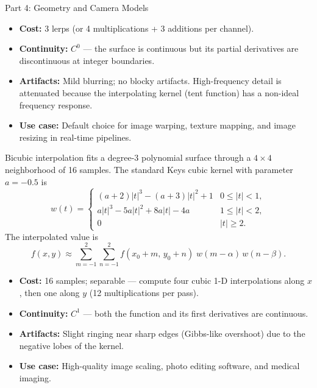 \documentclass[letterpaper]{article}
\begin{document}
\begin{notes}{Part 4: Geometry and Camera Models}
\begin{itemize}
    \item \textbf{Cost:} 3 lerps (or 4 multiplications + 3 additions per channel).
    \item \textbf{Continuity:} $C^0$ — the surface is continuous but its partial derivatives are discontinuous at integer boundaries.
    \item \textbf{Artifacts:} Mild blurring; no blocky artifacts. High-frequency detail is attenuated because the interpolating kernel (tent function) has a non-ideal frequency response.
    \item \textbf{Use case:} Default choice for image warping, texture mapping, and image resizing in real-time pipelines.
\end{itemize}


Bicubic interpolation fits a degree-3 polynomial surface through a $4\times4$ neighborhood of 16 samples. The standard Keys cubic kernel with parameter $a=-0.5$ is
$$w(t) = \begin{cases}
(a+2)|t|^3 - (a+3)|t|^2 + 1 & 0 \le |t| < 1, \\
a|t|^3 - 5a|t|^2 + 8a|t| - 4a & 1 \le |t| < 2, \\
0 & |t| \ge 2.
\end{cases}$$
The interpolated value is
$$f(x,y) \approx \sum_{m=-1}^{2}\sum_{n=-1}^{2} f(x_0{+}m,\, y_0{+}n)\; w(m-\alpha)\, w(n-\beta).$$
\begin{itemize}
    \item \textbf{Cost:} 16 samples; separable — compute four cubic 1-D interpolations along $x$, then one along $y$ (12 multiplications per pass).
    \item \textbf{Continuity:} $C^1$ — both the function and its first derivatives are continuous.
    \item \textbf{Artifacts:} Slight ringing near sharp edges (Gibbs-like overshoot) due to the negative lobes of the kernel.
    \item \textbf{Use case:} High-quality image scaling, photo editing software, and medical imaging.
\end{itemize}



\end{notes}
\end{document}
